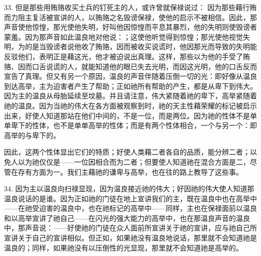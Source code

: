 33. 但是那些用贿赂收买士兵的钉死主的人，或许曾就保禄说过： 因为那些藉行贿而力阻主复活被宣讲的人，以贿赂之名毁谤保禄，使他的启示不被相信。因此，那声音使他惊惶，那光使他失明，好叫他因惊惶而平息其暴烈，他的失明则使毁谤者蒙羞。因为那声音如此温良地对他说：；这使他听觉得到惊惶；那光使他视觉失明，为的是当毁谤者说他收了贿赂，因而被收买说谎时，他因那光而导致的失明能反驳他们，表明正是藉这光，他才被迫说出真理。这样，那些以为他的手受了贿赂、因而口舌说谎的人，就能知道他的眼已失去光明，而因这光明，他的口舌反而宣告了真理。但又有另一个原因，温良的声音伴随着压倒一切的光：即好像从温良到达高举，主为迫害者产生了帮助；正如祂所有帮助的产生，都是从卑下到伟大。因为主的温良从母胎延续至坟墓。并且请注意，伟大紧随着祂的卑下，高举紧随着祂的温良。因为当祂的伟大在各方面被观察到时，祂的天主性藉荣耀的标记被启示出来，好使人知道那站在他们中间的，不是一位，而是两位。因为祂的性体不是单单卑下的性体，也不是单单高举的性体；而是有两个性体相合，一个与另一个：即高举的与卑下的。\par

因此，这两个性体显出它们的特质；好使人类藉二者各自的品质，能分辨二者；以免人以为祂仅仅是——一位因相合而为二者；但要使人知道祂在混合方面是二，尽管在存有方面为一。我们主藉祂的谦卑与高举，也在往的路上教导了这些事。\par

34. 因为主以温良向扫禄显现，因为温良接近祂的伟大；好因祂的伟大使人知道那温良说话的是谁。因为正如祂的门徒在地上宣讲我们的主，既在温良中也在高举中——在祂受迫害的温良中，也在祂标记的高举中——同样，主也在保禄面前以温良和以高举宣讲了祂自己——在闪光的强大能力的高举中，也在那温良声音的温良中，那声音说：——好使祂的门徒在众人面前所宣讲关于祂的宣讲，应与祂自己所宣讲关于自己的宣讲相似。但正如，如果祂没有温良地说话，那里就不会知道祂是温良的；同样，如果祂没有以压倒性的光显现，那里就不会知道祂是高举的。\par

